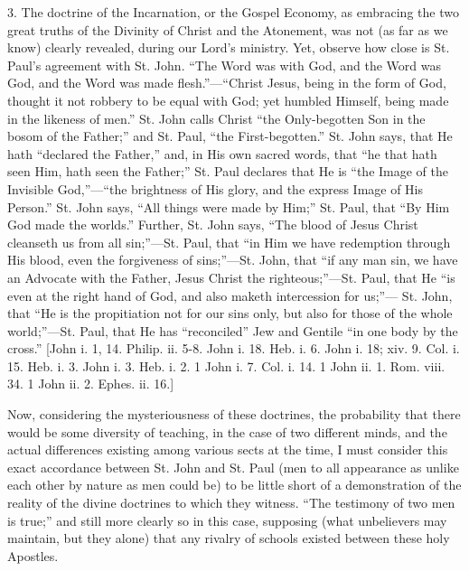 3. The doctrine of the Incarnation, or the Gospel Economy, as
embracing the two great truths of the Divinity of Christ and the
Atonement, was not (as far as we know) clearly revealed, during our
Lord's ministry. Yet, observe how close is St. Paul's agreement with St.
John. ``The Word was with God, and the Word was God, and the Word
was made flesh.''—``Christ Jesus, being in the form of God,
thought it not robbery to be equal with God; yet humbled Himself, being
made in the likeness of men.'' St. John calls Christ ``the
Only-begotten Son in the bosom of the Father;'' and St. Paul,
``the First-begotten.'' St. John says, that He hath
``declared the Father,'' and, in His own sacred words, that
``he that hath seen Him, hath seen the Father;'' St. Paul
declares that He is ``the Image of the Invisible God,''—``the
brightness of His glory, and the express Image of His Person.'' St.
John says, ``All things were made by Him;'' St. Paul, that
``By Him God made the worlds.'' Further, St. John says,
``The blood of Jesus Christ cleanseth us from all sin;''—St.
Paul, that ``in Him we have redemption through His blood, even the
forgiveness of sins;''—St. John, that ``if any man sin, we
have an Advocate with the Father, Jesus Christ the righteous;''—St.
Paul, that He ``is even at the right hand of God, and also maketh
intercession for us;''— St. John, that ``He is the propitiation
not for our sins only, but also for those of the whole world;''—St.
Paul, that He has ``reconciled'' Jew and Gentile ``in one
body by the cross.'' [John i. 1, 14. Philip. ii. 5-8. John i. 18.
Heb. i. 6. John i. 18; xiv. 9. Col. i. 15. Heb. i. 3. John i. 3. Heb. i.
2. 1 John i. 7. Col. i. 14. 1 John ii. 1. Rom. viii. 34. 1 John ii. 2.
Ephes. ii. 16.]

Now, considering the mysteriousness of these doctrines, the
probability that there would be some diversity of teaching, in the case
of two different minds, and the actual differences existing among
various sects at the time, I must consider this exact accordance between
St. John and St. Paul (men to all appearance as unlike each other by
nature as men could be) to be little short of a demonstration of the
reality of the divine doctrines to which they witness. ``The
testimony of two men is true;'' and still more clearly so in this
case, supposing (what unbelievers may maintain, but they alone) that any
rivalry of schools existed between these holy Apostles.

